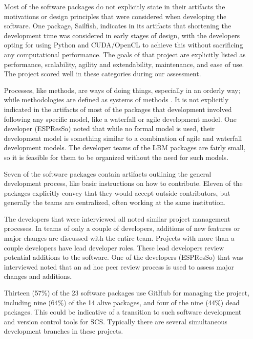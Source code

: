 \documentclass[12pt, notitlepage]{article}
\begin{document}
Most of the software packages do not explicitly state in their artifacts the motivations or design principles that were considered when developing the software. One package, Sailfish, indicates in its artifacts that shortening the development time was considered in early stages of design, with the developers opting for using Python and CUDA/OpenCL to achieve this without sacrificing any computational performance. The goals of that project are explicitly listed as performance, scalability, agility and extendability, maintenance, and ease of use. The project scored well in these categories during our assessment.

Processes, like methods, are ways of doing things, especially in an orderly way; while methodologies are defined as systems of methods \citep{ghezzi1991fundamentals}. It is not explicitly indicated in the artifacts of most of the packages that development involved following any specific model, like a waterfall or agile development model. One developer (ESPResSo) noted that while no formal model is used, their development model is something similar to a combination of agile and waterfall development models. The developer teams of the LBM packages are fairly small, so it is feasible for them to be organized without the need for such models. 

Seven of the software packages contain artifacts outlining the general development process, like basic instructions on how to contribute. Eleven of the packages explicitly convey that they would accept outside contributors, but generally the teams are centralized, often working at the same institution. 

The developers that were interviewed all noted similar project management processes. In teams of only a couple of developers, additions of new features or major changes are discussed with the entire team. Projects with more than a couple developers have lead developer roles. These lead developers review potential additions to the software. One of the developers (ESPResSo) that was interviewed noted that an ad hoc peer review process is used to assess major changes and additions.

Thirteen (57\%) of the 23 software packages use GitHub for managing the project, including nine (64\%) of the 14 alive packages, and four of the nine (44\%) dead packages. This could be indicative of a transition to such software development and version control tools for SCS. Typically there are several simultaneous development branches in these projects.
\end{document}
